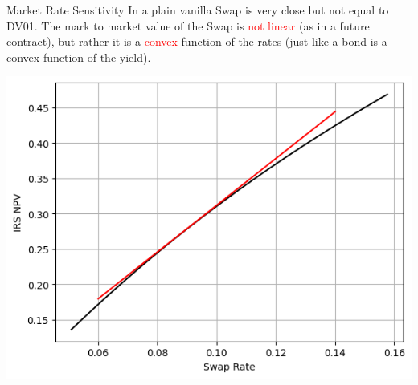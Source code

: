 \documentclass{beamer}
\begin{document}
\begin{frame}{Market Rate Sensitivity}
In a plain vanilla Swap is very close but not equal to DV01. The mark to market value of the Swap is \textcolor{red}{not linear} (as in a future contract), but rather it is a \textcolor{red}{convex} function of the rates (just like a bond is a convex function of the yield).
\begin{center}
\includegraphics[width=0.5\linewidth]{images/dv01}
\end{center}
\end{frame}

\end{document}
